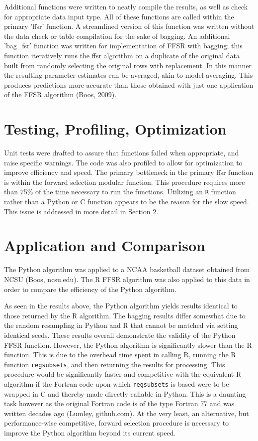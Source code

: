 \documentclass[12pt]{article}
\begin{document}
Additional functions were written to neatly compile the results, as well as check for appropriate data input type.
All of these functions are called within the primary 'ffsr' function.  A streamlined version of this function was written 
without the data check or table compilation for the sake of bagging.  An additional 'bag\_fsr' function was written for 
implementation of FFSR with bagging; this function iteratively runs the ffsr algorithm on a duplicate of the original data 
built from randomly selecting the original rows with replacement.  In this manner the resulting parameter estimates can be 
averaged, akin to model averaging.  This produces predictions more accurate than those obtained with just one application 
of the FFSR algorithm (Boos, 2009).


\section{Testing, Profiling, Optimization}
Unit tests were drafted to assure that functions failed when appropriate, and raise 
specific warnings.  The code was also profiled to allow for optimization to improve efficiency and speed.  The primary 
bottleneck in the primary ffsr function is within the forward selection modular function.  This procedure requires more 
than 75\% of the time necessary to run the functions.  Utilizing an \texttt{R} function rather than a Python or C function 
appears to be the reason for the slow speed.  This issue is addressed in more detail in Section \ref{sec:comp}.


\section{Application and Comparison}
\label{sec:comp}
The Python algorithm was applied to a NCAA basketball dataset obtained from NCSU (Boos, ncsu.edu).  The R FFSR algorithm was 
also applied to this data in order to compare the efficiency of the Python algorithm.

As seen in the results above, the Python algorithm yields results identical to those returned by the R algorithm.  The bagging 
results differ somewhat due to the random resampling in Python and R that cannot be matched via setting identical seeds.  These 
results overall demonstrate the validity of the Python FFSR function.  However, the Python algorithm is significantly slower 
than the R function.  This is due to the 
overhead time spent in calling R, running the R function \texttt{regsubsets}, and then returning the results for processing.  
This procedure would be significantly faster and competitive with the equivalent R algorithm if the Fortran code upon which 
\texttt{regsubsets} is based were to be wrapped in C and thereby made directly callable in Python.  This is a daunting task 
however as the original Fortran code is of the type Fortran 77 and was written decades ago (Lumley, github.com).  At the very 
least, an alternative, but performance-wise competitive, forward selection procedure is necessary to improve the Python 
algorithm beyond its current speed.
\end{document}
